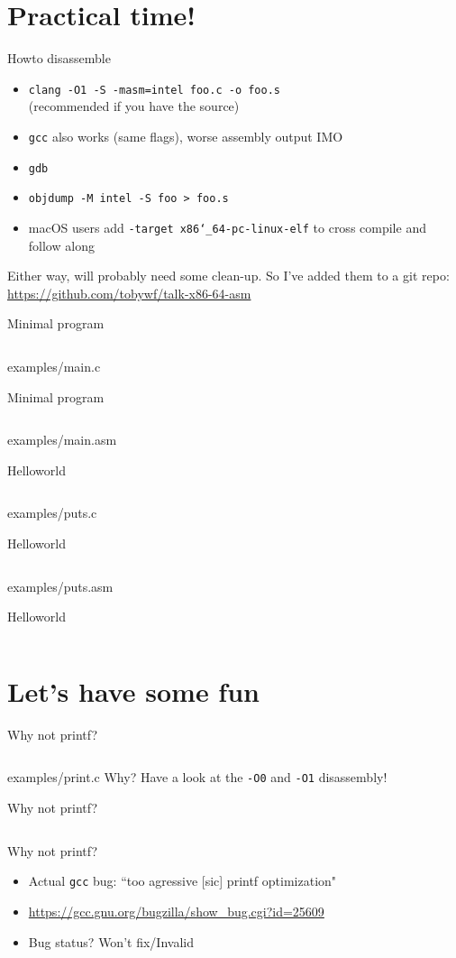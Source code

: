 \documentclass[table,xetex,12pt,aspectratio=169]{beamer}
\newcommand{\inputmintedtitle}[3][]{\inputminted[#1]{#2}{#3}{#3}}
\begin{document}
\section{Practical time!}

\begin{frame}{Howto disassemble}
\begin{itemize}
\item \texttt{clang -O1 -S -masm=intel foo.c -o foo.s}\\(recommended if you have the source)
\item \texttt{gcc} also works (same flags), worse assembly output IMO
\item \texttt{gdb}
\item \texttt{objdump -M intel -S foo > foo.s}
\item macOS users add \texttt{-target x86\char`_64-pc-linux-elf} to cross compile and follow along
\end{itemize}
\vfill
Either way, will probably need some clean-up. So I've added them to a git repo: \url{https://github.com/tobywf/talk-x86-64-asm}
\end{frame}

\begin{frame}{Minimal program}
\inputmintedtitle{C}{examples/main.c}
\end{frame}
\begin{frame}{Minimal program}
\inputmintedtitle{nasm}{examples/main.asm}
\end{frame}

\begin{frame}{Helloworld}
\inputmintedtitle{C}{examples/puts.c}
\end{frame}
\begin{frame}{Helloworld}
\inputmintedtitle[firstline=17]{nasm}{examples/puts.asm}
\end{frame}
\begin{frame}{Helloworld}
\inputminted[lastline=15]{nasm}{examples/puts.asm}
\end{frame}

\section{Let's have some fun}

\begin{frame}{Why not printf?}
\inputmintedtitle{C}{examples/print.c}
\vfill
Why? Have a look at the \texttt{-O0} and \texttt{-O1} disassembly!
\end{frame}
\begin{frame}{Why not printf?}
\inputminted{nasm}{examples/print.asm}
\end{frame}
\begin{frame}{Why not printf?}
\begin{itemize}
\item Actual \texttt{gcc} bug: ``too agressive [sic] printf optimization"
\item \url{https://gcc.gnu.org/bugzilla/show_bug.cgi?id=25609}
\item Bug status?\pause{} Won't fix/Invalid
\end{itemize}
\end{frame}
\end{document}
